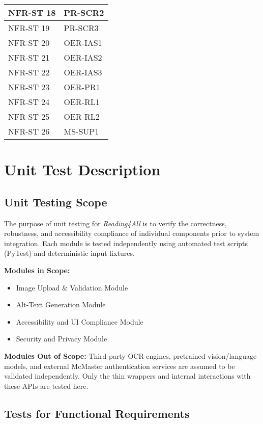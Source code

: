 \documentclass[12pt, titlepage]{article}
\begin{document}
\begin{longtable}{|p{8.0cm}|p{8.0cm}|}
  NFR-ST 18 & PR-SCR2 \\ \hline
  NFR-ST 19 & PR-SCR3 \\ \hline
  NFR-ST 20 & OER-IAS1 \\ \hline
  NFR-ST 21 & OER-IAS2 \\ \hline
  NFR-ST 22 & OER-IAS3 \\ \hline
  NFR-ST 23 & OER-PR1 \\ \hline
  NFR-ST 24 & OER-RL1 \\ \hline
  NFR-ST 25 & OER-RL2 \\ \hline
  NFR-ST 26 & MS-SUP1 \\
  \bottomrule
\end{longtable}

\section{Unit Test Description}
\label{Unit Test Desc}

\subsection{Unit Testing Scope}

The purpose of unit testing for \textit{Reading4All} is to verify the
correctness, robustness, and accessibility compliance of individual
components prior to system integration. Each module is tested
independently using automated test scripts (PyTest) and deterministic
input fixtures.

\textbf{Modules in Scope:}
\begin{itemize}
  \item Image Upload \& Validation Module
  \item Alt-Text Generation Module
  \item Accessibility and UI Compliance Module
  \item Security and Privacy Module
\end{itemize}

\textbf{Modules Out of Scope:}
Third-party OCR engines, pretrained vision/language models, and
external McMaster authentication services are assumed to be validated
independently. Only the thin wrappers and internal interactions with
these APIs are tested here.

\subsection{Tests for Functional Requirements}
\end{document}
